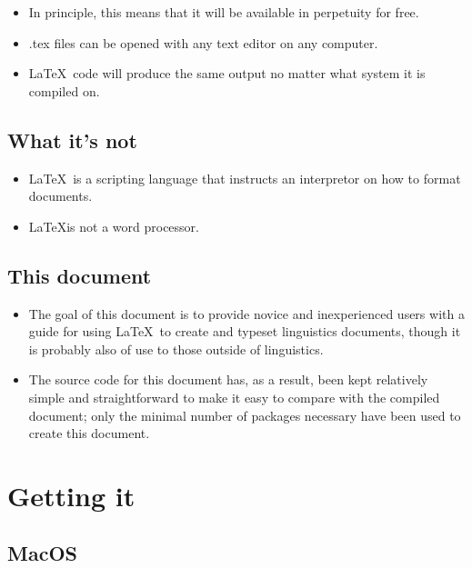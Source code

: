 \documentclass[11pt, letterpaper]{article}
\begin{document}
      \begin{itemize}
	\item In principle, this means that it will be available in perpetuity for free.
	\item .tex files can be opened with any text editor on any computer.
        \item \LaTeX\ code will produce the same output no matter what system it is compiled on.
      \end{itemize}


  \subsection{What it's not}
  
    \begin{itemize}
      \item \LaTeX\ is a scripting language that instructs an interpretor on how to format documents.

      \item \LaTeX is not a word processor. 
      
    \end{itemize}

  \subsection{This document}
  
    \begin{itemize}
      \item The goal of this document is to provide novice and inexperienced users with a guide for using \LaTeX\ to create and typeset linguistics documents, though it is probably also of use to those outside of linguistics.
      
      \item The source code for this document has, as a result, been kept relatively simple and straightforward to make it easy to compare with the compiled document; only the minimal number of packages necessary have been used to create this document.
    \end{itemize}


  \section{Getting it}
  
  \subsection{MacOS}
  
\end{document}
